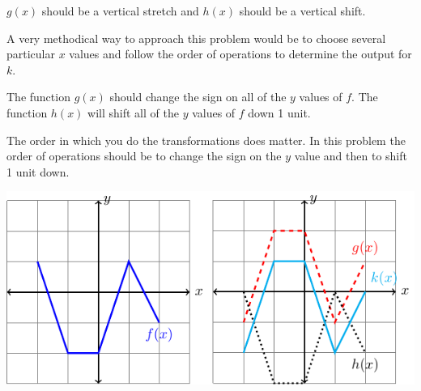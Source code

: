 \begin{bighint}
    \ba
        \item $g(x)$ should be a vertical stretch and $h(x)$ should be a vertical shift.
        \item A very methodical way to approach this problem would be to choose several
            particular $x$ values and follow the order of operations to determine the
            output for $k$.
    \ea
\end{bighint}
\begin{activitySolution}
    \ba
        \item The function $g(x)$ should change the sign on all of the $y$ values of $f$.
            The function $h(x)$ will shift all of the $y$ values of $f$ down 1 unit.
        \item The order in which you do the transformations does matter.  In this problem
            the order of operations should be to change the sign on the $y$ value and then
            to shift 1 unit down.
    \ea
    \begin{center}
        \includegraphics[width=0.65\columnwidth]{figures/0-3-fig2soln.pdf}
    \end{center}
\end{activitySolution}

\aftera
